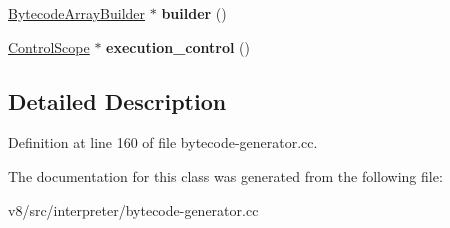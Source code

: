 \begin{DoxyCompactItemize}
\mbox{\hyperlink{classv8_1_1internal_1_1interpreter_1_1BytecodeArrayBuilder}{Bytecode\+Array\+Builder}} $\ast$ {\bfseries builder} ()
\item 
\mbox{\label{classv8_1_1internal_1_1interpreter_1_1BytecodeGenerator_1_1ControlScope_1_1DeferredCommands_aeb92365b93d69ec188339331e24e3704}} 
\mbox{\hyperlink{classv8_1_1internal_1_1interpreter_1_1BytecodeGenerator_1_1ControlScope}{Control\+Scope}} $\ast$ {\bfseries execution\+\_\+control} ()
\end{DoxyCompactItemize}


\subsection{Detailed Description}


Definition at line 160 of file bytecode-\/generator.\+cc.



The documentation for this class was generated from the following file\+:\begin{DoxyCompactItemize}
\item 
v8/src/interpreter/bytecode-\/generator.\+cc\end{DoxyCompactItemize}
